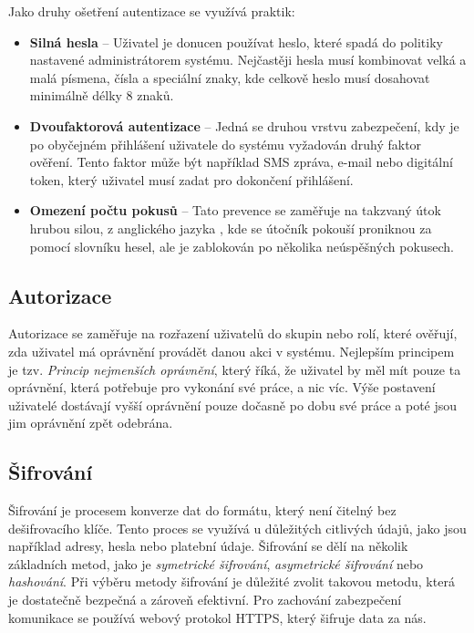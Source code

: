 \noindent
Jako druhy ošetření autentizace se využívá praktik:
\begin{itemize}
    \item \textbf{Silná hesla} -- Uživatel je donucen používat heslo, které spadá do politiky nastavené administrátorem systému. Nejčastěji hesla musí kombinovat velká a malá písmena, čísla a speciální znaky, kde celkově heslo musí dosahovat minimálně délky 8 znaků.
    \item \textbf{Dvoufaktorová autentizace} -- Jedná se druhou vrstvu zabezpečení, kdy je po obyčejném přihlášení uživatele do systému vyžadován druhý faktor ověření. Tento faktor může být například SMS zpráva, e-mail nebo digitální token, který uživatel musí zadat pro dokončení přihlášení.
    \item \textbf{Omezení počtu pokusů} -- Tato prevence se zaměřuje na takzvaný útok hrubou silou, z anglického jazyka \textit{}, kde se útočník pokouší proniknou za pomocí slovníku hesel, ale je zablokován po několika neúspěšných pokusech.
\end{itemize}

\subsection{Autorizace}
\label{subsec:security-authorization}
Autorizace se zaměřuje na rozřazení uživatelů do skupin nebo rolí, které ověřují, zda uživatel má oprávnění provádět danou akci v systému. Nejlepším principem je tzv. \textit{Princip nejmenších oprávnění}, který říká, že uživatel by měl mít pouze ta oprávnění, která potřebuje pro vykonání své práce, a nic víc. Výše postavení uživatelé dostávají vyšší oprávnění pouze dočasně po dobu své práce a poté jsou jim oprávnění zpět odebrána.

\subsection{Šifrování}
\label{subsec:security-encryption}
Šifrování je procesem konverze dat do formátu, který není čitelný bez dešifrovacího klíče. Tento proces se využívá u důležitých citlivých údajů, jako jsou například adresy, hesla nebo platební údaje. Šifrování se dělí na několik základních metod, jako je \textit{symetrické šifrování}, \textit{asymetrické šifrování} nebo \textit{hashování}. Při výběru metody šifrování je důležité zvolit takovou metodu, která je dostatečně bezpečná a zároveň efektivní. Pro zachování zabezpečení komunikace se používá webový protokol HTTPS, který šifruje data za nás.


